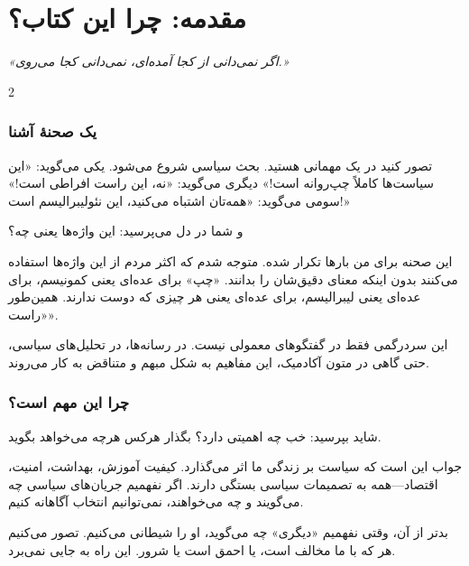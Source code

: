 \chapter*{مقدمه: چرا این کتاب؟}

\begin{tcolorbox}[
    enhanced,
    colback=lightbg,
    colframe=darkgray,
    boxrule=1pt,
    arc=5pt
]
\begin{center}
\textit{«اگر نمی‌دانی از کجا آمده‌ای، نمی‌دانی کجا می‌روی.»}
\end{center}
\end{tcolorbox}

\vspace{5mm}

\begin{multicols}{2}

\subsection*{یک صحنهٔ آشنا}

تصور کنید در یک مهمانی هستید. بحث سیاسی شروع می‌شود. یکی می‌گوید: «این سیاست‌ها کاملاً چپ‌روانه است!» دیگری می‌گوید: «نه، این راست افراطی است!» سومی می‌گوید: «همه‌تان اشتباه می‌کنید، این نئولیبرالیسم است!»

و شما در دل می‌پرسید: این واژه‌ها یعنی چه؟

این صحنه برای من بارها تکرار شده. متوجه شدم که اکثر مردم از این واژه‌ها استفاده می‌کنند بدون اینکه معنای دقیق‌شان را بدانند. «چپ» برای عده‌ای یعنی کمونیسم، برای عده‌ای یعنی لیبرالیسم، برای عده‌ای یعنی هر چیزی که دوست ندارند. همین‌طور «راست».

این سردرگمی فقط در گفتگوهای معمولی نیست. در رسانه‌ها، در تحلیل‌های سیاسی، حتی گاهی در متون آکادمیک، این مفاهیم به شکل مبهم و متناقض به کار می‌روند.

\subsection*{چرا این مهم است؟}

شاید بپرسید: خب چه اهمیتی دارد؟ بگذار هرکس هرچه می‌خواهد بگوید.

جواب این است که سیاست بر زندگی ما اثر می‌گذارد. کیفیت آموزش، بهداشت، امنیت، اقتصاد—همه به تصمیمات سیاسی بستگی دارند. اگر نفهمیم جریان‌های سیاسی چه می‌گویند و چه می‌خواهند، نمی‌توانیم انتخاب آگاهانه کنیم.

بدتر از آن، وقتی نفهمیم «دیگری» چه می‌گوید، او را شیطانی می‌کنیم. تصور می‌کنیم هر که با ما مخالف است، یا احمق است یا شرور. این راه به جایی نمی‌برد.


\end{multicols}
